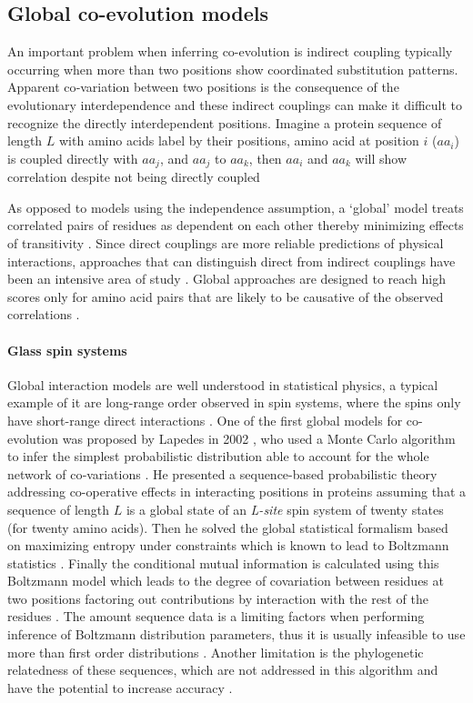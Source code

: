 \subsection{Global co-evolution models \label{sec:coevGlobal}}

An important problem when inferring co-evolution is indirect coupling typically occurring when more than two positions show coordinated substitution patterns.
Apparent co‐variation between two positions is the consequence of the evolutionary interdependence and these indirect couplings can make it difficult to recognize the directly interdependent positions.
Imagine a protein sequence of length $L$ with amino acids label by their positions, amino acid at position $i$ ($aa_i$) is coupled directly with $aa_j$, and $aa_j$ to $aa_k$, then $aa_i$ and $aa_k$ will show correlation despite not being directly coupled \cite{weigt2009identification}

As opposed to models using the independence assumption, a `global' model treats correlated pairs of residues as dependent on each other thereby minimizing effects of transitivity  \cite{marks2012protein}.
Since direct couplings are more reliable predictions of physical interactions, approaches that can distinguish direct from indirect couplings have been an intensive area of study \cite{de2013emerging}.
Global approaches are designed to reach high scores only for amino acid pairs that are likely to be causative of the observed correlations  \cite{marks2012protein}.


\paragraph{Glass spin systems}
Global interaction models are well understood in statistical physics, a typical example of it are long-range order observed in spin systems, where the spins only have short-range direct interactions \cite{binney1992theory}.
One of the first global models for co-evolution was proposed by Lapedes in 2002 \cite{lapedes2012using}, who used a Monte Carlo algorithm to infer the simplest probabilistic distribution able to account for the whole network of co‐variations \cite{de2013emerging}.
He presented a sequence-based probabilistic theory addressing co-operative effects in interacting positions in proteins assuming that a sequence of length $L$ is a global state of an \textit{L-site} spin system of twenty states (for twenty amino acids).
Then he solved the global statistical formalism based on maximizing entropy under constraints which is known to lead to Boltzmann statistics \cite{marks2012protein}.
Finally the conditional mutual information is calculated using this Boltzmann model which leads to the degree of covariation between residues at two positions factoring out contributions by interaction with the rest of the residues \cite{marks2012protein}.
The amount sequence data is a limiting factors when performing inference of Boltzmann distribution parameters, thus it is usually infeasible to use more than first order distributions \cite{lapedes2012using}.
Another limitation is the phylogenetic relatedness of these sequences, which are not addressed in this algorithm and have the potential to increase accuracy \cite{lapedes2012using}.

